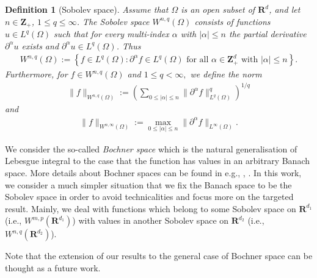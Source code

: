 \documentclass[a4paper]{article}
\newcommand{\rr}[1]{\mathbf{R}^{#1}}
\newcommand{\zzp}[1]{\mathbf{Z}_+^{#1}}
\newcommand{\norm}[2]{\|#1\|_{#2}}
\numberwithin{equation}{section}
\newtheorem{definition}[theorem]{Definition}
\theoremstyle{remark}
\begin{document}
\begin{definition}[Sobolev space]
Assume that $\Omega$ is an open subset of $\rr{d}$, and
let $n \in \zzp{}$, $1 \leq q \leq \infty$. 
The Sobolev space $W^{n, q}(\Omega)$
consists of functions $u \in L^{q}(\Omega)$
such that for every multi-index $\alpha$ with $|\alpha| \leqslant n$
the partial derivative $\partial^{\alpha} u$ exists
and $\partial^{\alpha} u \in L^{q}(\Omega)$.
Thus
\begin{align*}
W^{n, q}(\Omega):=\left\{f \in L^{q}(\Omega):
\partial^{\alpha} f \in L^{q}(\Omega) \text { for all }
\alpha \in \zzp{d} \text { with }|\alpha| \leq n\right\}.
\end{align*}
Furthermore, for $f \in W^{n, q}(\Omega)$ and $1 \leq q<\infty,$ we define the norm
\begin{align*}
\norm{f}{W^{n, q}(\Omega)}:=\left(\sum_{0 \leq|\alpha| \leq n}
    \norm{\partial^{\alpha} f}{L^{q}(\Omega)}^{q}\right)^{1 / q}
\end{align*}
and
\begin{align*}
\norm{f}{W^{n, \infty}(\Omega)}:=\max _{0 \leq|\alpha| \leq n}
    \norm{\partial^{\alpha} f}{L^{\infty}(\Omega)}.
\end{align*}
\end{definition}

We consider the so-called
\emph{Bochner space}
which is the natural generalisation of Lebesgue integral
to the case that the function has values
in an arbitrary Banach space.
More details about Bochner spaces can be found in
e.g., \cite[Section 3]{Kainen13BochnerIntegralsNeural},
\cite[Chapter 10]{Light85ApproximationTheoryTensor}.
In this work, we consider a much simpler situation
that we fix the Banach space to be the Sobolev space
in order to avoid technicalities
and focus more on the targeted result.
Mainly,
we deal with functions which belong to some Sobolev space
on $\rr{d_1}$ (i.e., $W^{m,p}(\rr{d_1})$)
with values in another Sobolev space on $\rr{d_2}$
(i.e., $W^{n,q}(\rr{d_2})$).

Note that the extension of our results to
the general case of Bochner space
can be thought as a future work.
\end{document}
